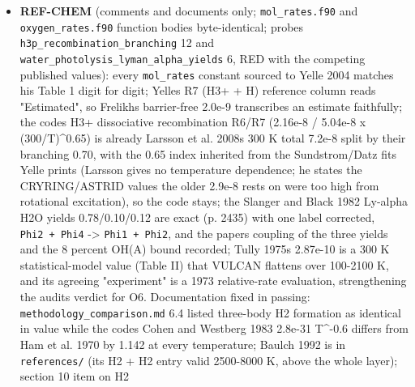 \documentclass[english,a4paper]{my_memo}
\begin{document}
\begin{itemize}
  claim that no transparent condition is expressible as a fixed point is too
  strong (Thompson 1990 Eq. (64) L\_5 = rho c g\_1 and P\&L Eq. (40)
  L\_1 = K (p - p\_inf) are algebraic in the face state; D6 stays the user\textquotesingle s
  decision with a third option). One gap stated: the source projection
  l\_1 C (gravity and the spherical divergence, Thompson 1990 footnote 1 and
  Eq. (52); the steady form is L\_1 = -rho c g\_1, not 0) survives only
  because both states of (C-) sit at the same radius; any reformulation
  relating cell 1\textquotesingle s center to the face must restore it. Carlson\textquotesingle s "but not U
  and p" marked unverified against the primaries.
\item
  \textbf{REF-CHEM} (comments and documents only; \texttt{mol\_rates.f90} and
  \texttt{oxygen\_rates.f90} function bodies byte-identical; probes
  \texttt{h3p\_recombination\_branching} 12 and \texttt{water\_photolysis\_lyman\_alpha\_yields}
  6, RED with the competing published values): every \texttt{mol\_rates} constant
  sourced to Yelle 2004 matches his Table 1 digit for digit; Yelle\textquotesingle s R7
  (H3+ + H) reference column reads "Estimated", so Frelikh\textquotesingle s barrier-free
  2.0e-9 transcribes an estimate faithfully; the code\textquotesingle s H3+ dissociative
  recombination R6/R7 (2.16e-8 / 5.04e-8 x (300/T)\^{}0.65) is already Larsson
  et al. 2008\textquotesingle s 300 K total 7.2e-8 split by their branching 0.70, with the
  0.65 index inherited from the Sundstrom/Datz fits Yelle prints (Larsson
  gives no temperature dependence; he states the CRYRING/ASTRID values the
  older 2.9e-8 rests on were too high from rotational excitation), so the
  code stays; the Slanger and Black 1982 Ly-alpha H2O yields 0.78/0.10/0.12
  are exact (p. 2435) with one label corrected, \texttt{Phi2\ +\ Phi4} -\textgreater{} \texttt{Phi1\ +\ Phi2}, and the paper\textquotesingle s coupling of the three yields and the 8 percent
  OH(A) bound recorded; Tully 1975\textquotesingle s 2.87e-10 is a 300 K statistical-model
  value (Table II) that VULCAN flattens over 100-2100 K, and its agreeing
  "experiment" is a 1973 relative-rate evaluation, strengthening the
  audit\textquotesingle s verdict for O6. Documentation fixed in passing: \texttt{methodology\_comparison.md}
  6.4 listed three-body H2 formation as identical in value while the code\textquotesingle s
  Cohen and Westberg 1983 2.8e-31 T\^{}-0.6 differs from Ham et al. 1970 by
  1.142 at every temperature; Baulch 1992 is in \texttt{references/} (its H2 + H2
  entry valid 2500-8000 K, above the whole layer); section 10 item on H2

\end{itemize}
\end{document}
